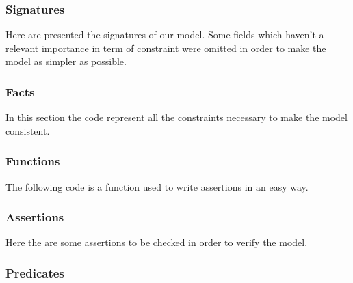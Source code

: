 \documentclass[a4paper]{article}
\begin{document}
\subsubsection{Signatures}

Here are presented the signatures of our model. Some fields which haven't a relevant importance in term of constraint were omitted in order to make the model as simpler as possible.

\nopagebreak
\begin{minipage}[c]{\codeWidth}

\end{minipage}

\subsubsection{Facts}

In this section the code represent all the constraints necessary to make the model consistent.

\nopagebreak
\begin{minipage}[c]{\codeWidth}

\end{minipage}


\subsubsection{Functions}

The following code is a function used to write assertions in an easy way.

\nopagebreak
\begin{minipage}[c]{\codeWidth}

\end{minipage}

\subsubsection{Assertions}

Here the are some assertions to be checked in order to verify the model.

\nopagebreak
\begin{minipage}[c]{\codeWidth}

\end{minipage}

\subsubsection{Predicates}
\end{document}
